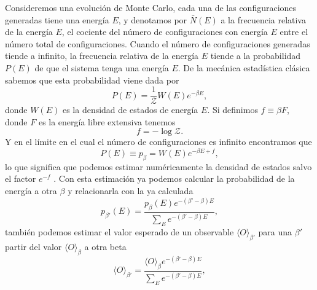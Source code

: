 Consideremos una evolución de Monte Carlo, cada una de las configuraciones
generadas tiene una energía $E$, y denotamos por $\bar{N}(E)$ a la frecuencia
relativa de la energía $E$, el cociente del número de configuraciones con
energía $E$ entre el número total de configuraciones. Cuando el número de
configuraciones generadas tiende a infinito, la frecuencia relativa de la
energía $E$ tiende a la probabilidad $P(E)$ de que el sistema tenga una
energía $E$. De la mecánica estadística clásica sabemos que esta probabilidad
viene dada por
\begin{equation}
P(E)=\frac{1}{\mathcal{Z}}W(E)e^{-\beta E},  
\end{equation}
donde $W(E)$ es la densidad de estados de energía $E$. Si definimos $f\equiv
\beta F$, donde $F$ es la energía libre extensiva tenemos
\begin{equation}
f=-\log \mathcal{Z}.
\end{equation}
Y en el límite en el cual el número de configuraciones es infinito encontramos
que
\begin{equation}
P(E)\equiv p_{\beta}=W(E)e^{-\beta E+f} ,
\end{equation}
lo que significa que podemos estimar numéricamente la densidad de estados
salvo el factor $e^{-f}$ \cite{Juan:tesis}. Con esta estimación ya podemos calcular la
probabilidad de la energía a otra $\beta$ y relacionarla con la ya calculada
\begin{equation}
p_{\beta'}(E)=\frac{p_{\beta}(E)e^{-(\beta'-\beta)E}}{\sum_E e^{-(\beta'-\beta)E}},
\end{equation}
también podemos estimar el valor esperado de un observable $\langle
O\rangle_{\beta'}$  para una $\beta'$ partir del valor $\langle
O\rangle_{\beta}$ a otra beta
\begin{equation}
\langle O\rangle_{\beta'}=\frac{\langle
O\rangle_{\beta} e^{-(\beta'-\beta)E}}{\sum_E e^{-(\beta'-\beta)E}},
\end{equation}

